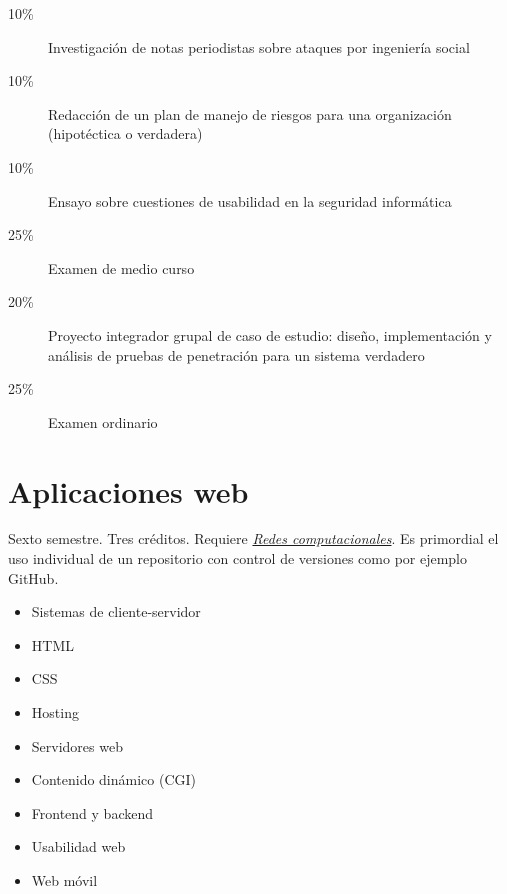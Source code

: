 \documentclass{article}
\begin{document}
\begin{multicols}{4}
\begin{description}
\item[10\%]{Investigaci\'{o}n de notas periodistas sobre ataques por
  ingenier\'{i}a social}
\item[10\%]{Redacci\'{o}n de un plan de manejo de riesgos para una
  organizaci\'{o}n (hipot\'{e}ctica o verdadera)}
\item[10\%]{Ensayo sobre cuestiones de usabilidad en la seguridad
  inform\'{a}tica}
\item[25\%]{Examen de medio curso}  
\item[20\%]{Proyecto integrador grupal de caso de estudio: dise\~{n}o,
  implementaci\'{o}n y an\'{a}lisis de pruebas de penetraci\'{o}n para un sistema
  verdadero}
\item[25\%]{Examen ordinario}
\end{description}  

\vfill\null \columnbreak

\hypertarget{aw}{\section*{Aplicaciones web}}  

Sexto semestre. Tres cr\'{e}ditos. Requiere \hyperlink{rc}{\em Redes
  computacionales}. Es primordial el uso individual de un repositorio
con control de versiones como por ejemplo GitHub.

\begin{itemize}
\item{Sistemas de cliente-servidor}
\item{HTML}
\item{CSS}
\item{Hosting}
\item{Servidores web}
\item{Contenido din\'{a}mico (CGI)}  
\item{Frontend y backend}
\item{Usabilidad web}
\item{Web m\'{o}vil}
\end{itemize}


\end{multicols}
\end{document}
